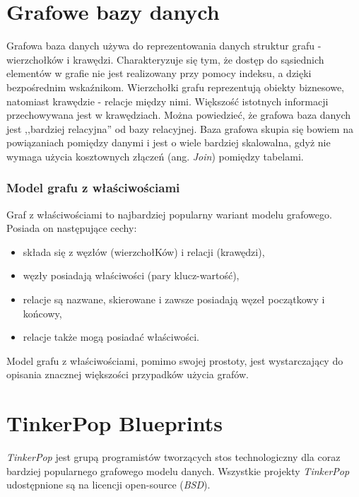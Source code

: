 \section{Grafowe bazy danych}
\label{sec:grafoweBazyDanych}

Grafowa baza danych używa do reprezentowania danych struktur grafu - wierzchołków i krawędzi. Charakteryzuje się tym, że dostęp do sąsiednich elementów w grafie nie jest realizowany przy pomocy indeksu, a dzięki bezpośrednim wskaźnikom. Wierzchołki grafu reprezentują obiekty biznesowe, natomiast krawędzie - relacje między nimi. Większość istotnych informacji przechowywana jest w krawędziach.
Można powiedzieć, że grafowa baza danych jest ,,bardziej relacyjna'' od bazy relacyjnej. Baza grafowa skupia się bowiem na powiązaniach pomiędzy danymi i jest o wiele bardziej skalowalna, gdyż nie wymaga użycia kosztownych złączeń (ang. \emph{Join}) pomiędzy tabelami.

\subsubsection{Model grafu z właściwościami}
\label{sec:modelGrafuWlasc}

Graf z właściwościami to najbardziej popularny wariant modelu grafowego. Posiada on następujące cechy:
\begin{itemize}
\item składa się z węzłów (wierzchołKów) i relacji (krawędzi),
\item węzły posiadają właściwości (pary klucz-wartość),
\item relacje są nazwane, skierowane i zawsze posiadają węzeł początkowy i końcowy,
\item relacje także mogą posiadać właściwości.
\end{itemize}
Model grafu z właściwościami, pomimo swojej prostoty, jest wystarczający do opisania znacznej większości przypadków użycia grafów.



\section{TinkerPop Blueprints}
\label{sec:tinkerPopBlueprints}

\emph{TinkerPop} jest grupą programistów tworzących stos technologiczny dla coraz bardziej popularnego grafowego modelu danych. Wszystkie projekty \emph{TinkerPop} udostępnione są na licencji open-source (\emph{BSD}).


